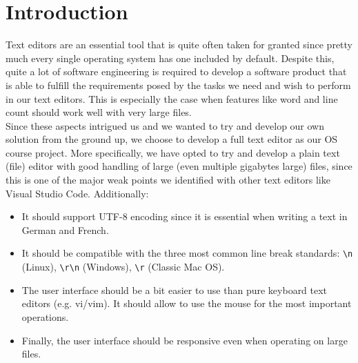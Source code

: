\section{Introduction}\label{sec:intro}


Text editors are an essential tool that is quite often taken for granted since pretty much every single operating system has one included by default. Despite this, quite a lot of software engineering is required to develop a software product that is able to fulfill the requirements posed by the tasks we need and wish to perform in our text editors. This is especially the case when features like word and line count should work well with very large files. \\
Since these aspects intrigued us and we wanted to try and develop our own solution from the ground up, we choose to develop a full text editor as our OS course project. More specifically, we have opted to try and develop a plain text (file) editor with good handling of large (even multiple gigabytes large) files, since this is one of the major weak points we identified with other text editors like Visual Studio Code.
Additionally: 
\begin{itemize}
\item  It should support UTF-8 encoding since it is essential when writing a text in German and French.
\item It should be compatible with the three most common line break standards: \verb|\n| (Linux), \verb|\r\n| (Windows), \verb|\r| (Classic Mac OS). 
\item The user interface should be a bit easier to use than pure keyboard text editors (e.g. vi/vim). It should allow to use the mouse for the most important operations.
\item Finally, the user interface should be responsive even when operating on large files.
\end{itemize}

